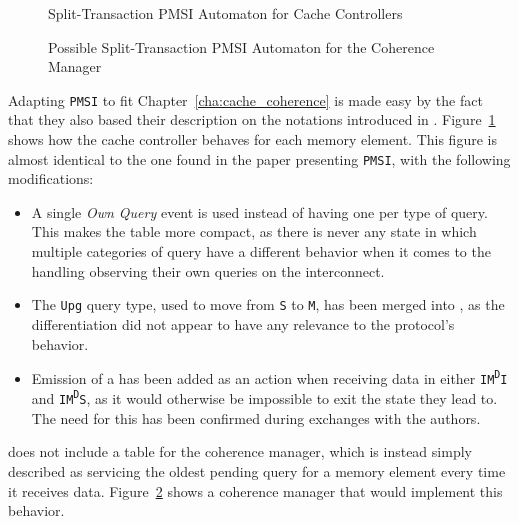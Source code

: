 \begin{figure}
\centering

\caption{Split-Transaction PMSI Automaton for Cache Controllers}
\label{fig:pmsi_cc_table}
\end{figure}

\begin{figure}
\centering

\caption{Possible Split-Transaction PMSI Automaton for the Coherence Manager}
\label{fig:pmsi_mgr_table}
\end{figure}

Adapting \texttt{PMSI} to fit Chapter~\ref{cha:cache_coherence} is made easy by
the fact that they also based their description on the notations introduced in
\cite{Sorin:2011:PMC:2028905}. Figure~\ref{fig:pmsi_cc_table} shows how the
cache controller behaves for each memory element.  This figure is almost
identical to the one found in the paper presenting \texttt{PMSI}, with the
following modifications:
\begin{itemize}
\item
   A single \textit{Own Query} event is used instead of having
   one per type of query. This makes the table more compact, as there is never
   any state in which multiple categories of query have a different behavior
   when it comes to the handling observing their own queries on the
   interconnect.
\item
   The \texttt{Upg} query type, used to move from \texttt{S} to \texttt{M}, has
   been merged into \getmquery{}, as the differentiation did not appear to have
   any relevance to the protocol's behavior.
\item
   Emission of a \putmquery{} has been added as an action when receiving data
   in either \texttt{IM\textsuperscript{D}I} and
   \texttt{IM\textsuperscript{D}S}, as it would otherwise be impossible to exit
   the state they lead to. The need for this has been confirmed during exchanges
   with the authors.
\end{itemize}
\cite{conf/rtas/HassanKP17} does
not include a table for the coherence manager, which is instead simply described
as servicing the oldest pending query for a memory element every time it
receives data. Figure~\ref{fig:pmsi_mgr_table} shows a coherence manager that
would implement this behavior.

